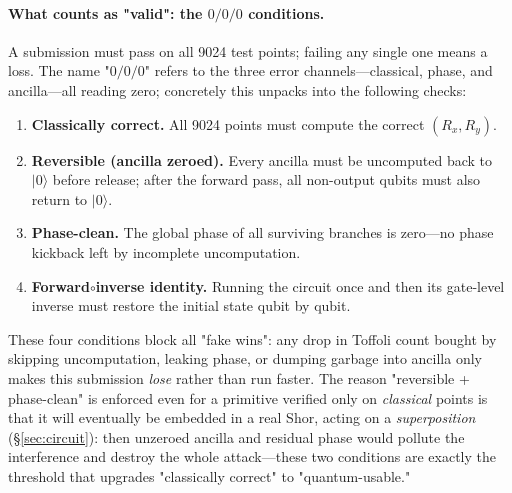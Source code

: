 \documentclass[11pt]{article}
\newcommand{\secref}[1]{\hyperref[#1]{\S\ref*{#1}}}
\begin{document}
\paragraph{What counts as "valid": the $0/0/0$ conditions.}A submission must pass on all 9024 test points; failing any single one means a loss. The name "$0/0/0$" refers to the three error channels---classical, phase, and ancilla---all reading zero; concretely this unpacks into the following checks:
\begin{enumerate}[leftmargin=1.9em]
\item \textbf{Classically correct.} All 9024 points must compute the correct $(R_x,R_y)$.
\item \textbf{Reversible (ancilla zeroed).} Every ancilla must be uncomputed back to $|0\rangle$ before release; after the forward pass, all non-output qubits must also return to $|0\rangle$.
\item \textbf{Phase-clean.} The global phase of all surviving branches is zero---no phase kickback left by incomplete uncomputation.
\item \textbf{Forward$\circ$inverse identity.} Running the circuit once and then its gate-level inverse must restore the initial state qubit by qubit.
\end{enumerate}
These four conditions block all "fake wins": any drop in Toffoli count bought by skipping uncomputation, leaking phase, or dumping garbage into ancilla only makes this submission \emph{lose} rather than run faster.
The reason "reversible + phase-clean" is enforced even for a primitive verified only on \emph{classical} points is that it will eventually be embedded in a real Shor, acting on a \emph{superposition}
(\secref{sec:circuit}): then unzeroed ancilla and residual phase would pollute the interference and destroy the whole attack---these two conditions are exactly the threshold that upgrades "classically correct" to "quantum-usable."
\end{document}
